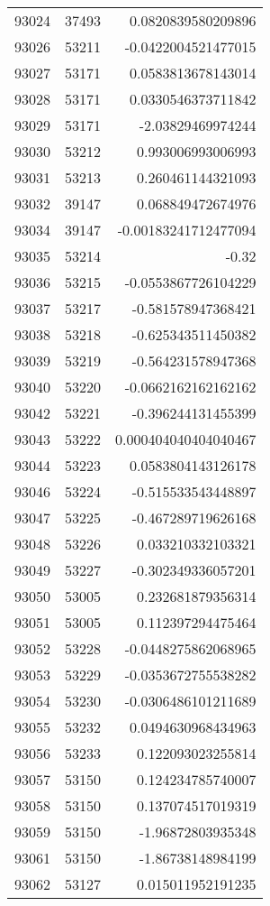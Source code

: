 \begin{tabular}{r | r | r}
93024 & 37493 & 0.0820839580209896 \\
93026 & 53211 & -0.0422004521477015 \\
93027 & 53171 & 0.0583813678143014 \\
93028 & 53171 & 0.0330546373711842 \\
93029 & 53171 & -2.03829469974244 \\
93030 & 53212 & 0.993006993006993 \\
93031 & 53213 & 0.260461144321093 \\
93032 & 39147 & 0.068849472674976 \\
93034 & 39147 & -0.00183241712477094 \\
93035 & 53214 & -0.32 \\
93036 & 53215 & -0.0553867726104229 \\
93037 & 53217 & -0.581578947368421 \\
93038 & 53218 & -0.625343511450382 \\
93039 & 53219 & -0.564231578947368 \\
93040 & 53220 & -0.0662162162162162 \\
93042 & 53221 & -0.396244131455399 \\
93043 & 53222 & 0.000404040404040467 \\
93044 & 53223 & 0.0583804143126178 \\
93046 & 53224 & -0.515533543448897 \\
93047 & 53225 & -0.467289719626168 \\
93048 & 53226 & 0.033210332103321 \\
93049 & 53227 & -0.302349336057201 \\
93050 & 53005 & 0.232681879356314 \\
93051 & 53005 & 0.112397294475464 \\
93052 & 53228 & -0.0448275862068965 \\
93053 & 53229 & -0.0353672755538282 \\
93054 & 53230 & -0.0306486101211689 \\
93055 & 53232 & 0.0494630968434963 \\
93056 & 53233 & 0.122093023255814 \\
93057 & 53150 & 0.124234785740007 \\
93058 & 53150 & 0.137074517019319 \\
93059 & 53150 & -1.96872803935348 \\
93061 & 53150 & -1.86738148984199 \\
93062 & 53127 & 0.015011952191235 \\

\end{tabular}
